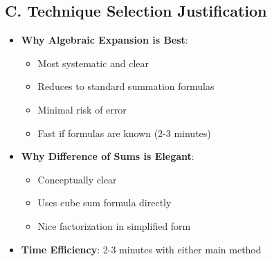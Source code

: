 \documentclass[12pt]{article}
\begin{document}
\begin{techniquesbox}
\subsection*{C. Technique Selection Justification}
\begin{itemize}[leftmargin=*]
    \item \textbf{Why Algebraic Expansion is Best}: 
    \begin{itemize}
        \item Most systematic and clear
        \item Reduces to standard summation formulas
        \item Minimal risk of error
        \item Fast if formulas are known (2-3 minutes)
    \end{itemize}
    \item \textbf{Why Difference of Sums is Elegant}:
    \begin{itemize}
        \item Conceptually clear
        \item Uses cube sum formula directly
        \item Nice factorization in simplified form
    \end{itemize}
    \item \textbf{Time Efficiency}: 2-3 minutes with either main method
\end{itemize}
\end{techniquesbox}
\end{document}

